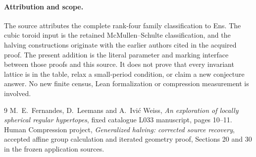 \documentclass[11pt,a4paper]{article}
\begin{document}
\paragraph{Attribution and scope.}
The source attributes the complete rank-four family classification to
Ens. The cubic toroid input is the retained McMullen--Schulte
classification, and the halving constructions originate with the earlier
authors cited in the acquired proof. The present addition is the literal
parameter and marking interface between those proofs and this source.
It does not prove that every invariant lattice is in the table, relax a
small-period condition, or claim a new conjecture answer. No new finite
census, Lean formalization or compression measurement is involved.

\begin{thebibliography}{9}
 M.~E.~Fernandes, D.~Leemans and A.~Ivi\'c Weiss,
\emph{An exploration of locally spherical regular hypertopes},
fixed catalogue L033 manuscript, pages 10--11.
 Human Compression project,
\emph{Generalized halving: corrected source recovery},
accepted affine group calculation and iterated geometry proof,
Sections 20 and 30 in the frozen application sources.
\end{thebibliography}
\end{document}
